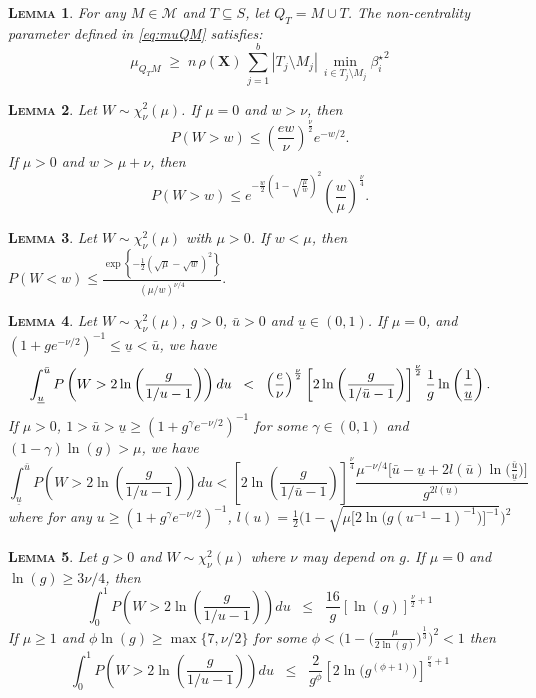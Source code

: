 \documentclass[aos]{imsart}
\theoremstyle{plain}
\newtheorem{lem}{\textsc{Lemma}}[section]
\newcommand{\bs}{\boldsymbol}
\begin{document}
\begin{supplement}
\begin{lem}\label{lem:boundrhogen}
 For any $M\in\mathcal{M}$ and $T\subseteq S$, let $Q_T=M \cup T$. The non-centrality parameter defined in \eqref{eq:muQM} satisfies: 
\begin{equation}
    \mu_{Q_TM}\; \geq \;n\,\rho(\bs X)\,\sum_{j=1}^b|T_j\setminus M_j|\,\min_{i\in T_j\setminus M_j}{\beta_{i}^{\star}}^2
\end{equation}
\end{lem}

\begin{lem}\label{lemma:s1s3}
Let $W \sim \chi_\nu^2(\mu)$. If $\mu=0$ and $w>\nu$, then 
$$P(W>w) \leq\left(\frac{e w}{\nu}\right)^{\frac{\nu}{2}} e^{-w / 2}.$$
If $\mu>0$ and $w>\mu+\nu$, then
$$
P(W>w) \leq e^{-\frac{w}{2}\left(1-\sqrt{\frac{\mu}{w}}\right)^2}\left(\frac{w}{\mu}\right)^{\frac{\nu}{4}} .
$$
\end{lem}

\begin{lem}\label{lemma:s2} Let $W \sim \chi_\nu^2(\mu)$ with $\mu>0$. If $w<\mu$, then $
P(W<w) \leq \frac{\exp \left\{-\frac{1}{2}(\sqrt{\mu}-\sqrt{w})^2\right\}}{(\mu / w)^{\nu / 4}}.
$
\end{lem}


\begin{lem}\label{lemma:s18} 
    Let  $W\sim \chi_\nu^2(\mu)$, $g>0$, $\bar{u}>0$ and $\underline{u}\in(0,1)$. If $\mu=0$, and $\left(1+ge^{-\nu/2}\right)^{-1}\leq\underline{u}<\bar{u}$, we have
$$
\int_{\underline{u}}^{\bar{u}} P\left(W>2 \ln \left(\frac{g}{1 / u-1}\right)\right) d u\;\;<\;\;\left(\frac{e}{\nu}\right)^{\nu\over2}\left[2 \ln \left(\frac{g}{1 / \bar{u}-1}\right)\right]^{\nu\over2} \frac{1}{g}\ln \left(\frac{1}{\underline{u}}\right) .
$$
    If $\mu>0$, $1>\bar{u}>\underline{u}\geq\left(1+g^{\gamma}e^{-\nu/2}\right)^{-1}$ for some $\gamma\in(0,1)$ and $(1-\gamma)\ln(g)>\mu$, we have
$$
\int_{\underline{u}}^{\bar{u}} P\left(W>2 \ln \left(\frac{g}{1 / u-1}\right)\right) d u<\left[2 \ln \left(\frac{g}{1 / \bar{u}-1}\right)\right]^{\frac{\nu}{4}} \frac{\mu^{-\nu/4}\Big[\bar{u}-\underline{u}+2l(\bar{u})\ln\Big(\frac{\bar{u}}{\underline{u}}\Big)\Big]}{g^{2l(\underline{u})}} 
$$
where for any $u\geq\left(1+g^{\gamma}e^{-\nu/2}\right)^{-1}$, $l(u)=\frac{1}{2}\Big(1-\sqrt{\mu\big[2\ln\big(g(u^{-1}-1)^{-1}\big)\big]^{-1}}\Big)^2$
\end{lem}

\begin{lem}\label{lemma:s20}
Let $g>0$ and $W \sim \chi_\nu^2(\mu)$ where $\nu$ may depend on $g$. If $\mu=0$ and $\ln(g) \geq 3\nu/4$, then $$
\int_0^1 P\left(W>2 \ln \left(\frac{g}{1 / u-1}\right)\right) d u\;\; \leq\;\; \frac{16}{g}\left[\ln \left(g\right)\right]^{\frac{\nu}{2}+1} $$
If $\mu\geq 1$ and $\phi\ln(g) \geq \max\{7,\nu/2\}$ for some $\phi < \Big(1-\big(\frac{\mu}{2\ln(g)}\big)^{\frac{1}{3}}\Big)^2<1$ then
$$
\int_0^1 P\left(W>2 \ln \left(\frac{g}{1 / u-1}\right)\right) d u\;\; \leq\;\; \frac{2}{g^{\phi}} 
\left[2\ln\big(g^{(\phi+1)}\big)\right]^{\frac{\nu}{4}+1} $$
\end{lem}






\end{supplement}
\end{document}
